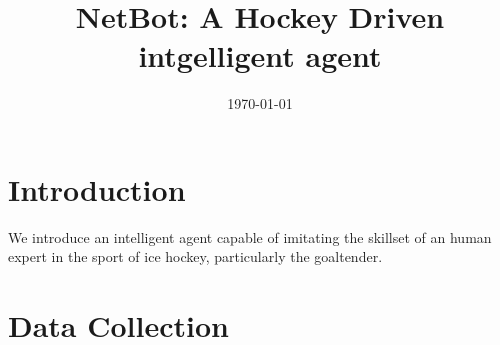 \documentclass[a4paper]{article}
\title{NetBot: A Hockey Driven intgelligent agent}
\date{\today}
\begin{document}
\maketitle
\section{Introduction}
We introduce an intelligent agent capable of imitating the skillset of an human expert in the sport of ice hockey, particularly the goaltender. 

\section{Data Collection}
\end{document}
